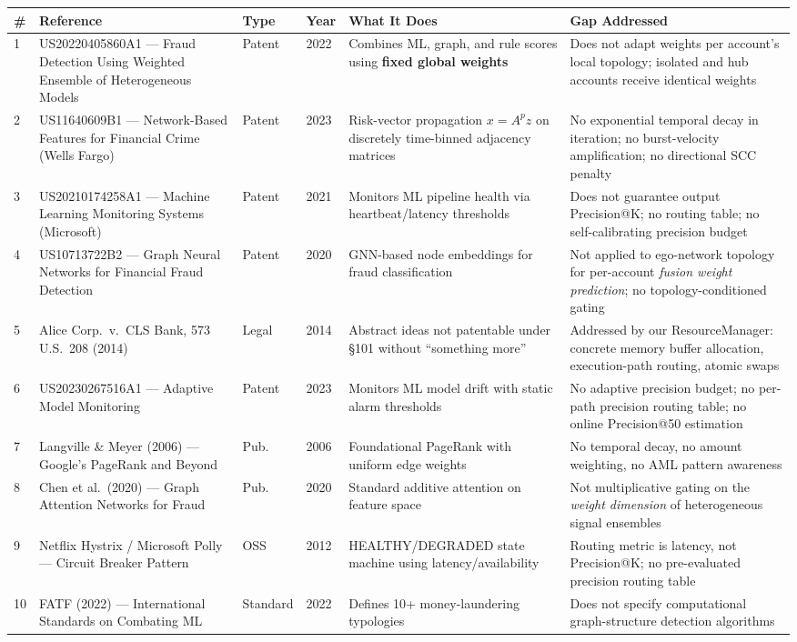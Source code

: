 \documentclass[12pt,a4paper]{article}
\begin{document}
\begin{longtable}{p{0.3cm} p{4.0cm} p{1.0cm} p{0.6cm} p{4.5cm} p{3.5cm}}
\toprule
\# & Reference & Type & Year & What It Does & Gap Addressed \\
\midrule
\endhead
1 & US20220405860A1 --- Fraud Detection Using Weighted Ensemble of Heterogeneous Models & Patent & 2022 &
  Combines ML, graph, and rule scores using \textbf{fixed global weights} &
  Does not adapt weights per account's local topology; isolated and hub accounts receive identical weights \\
\midrule
2 & US11640609B1 --- Network-Based Features for Financial Crime (Wells Fargo) & Patent & 2023 &
  Risk-vector propagation $x = A^p z$ on discretely time-binned adjacency matrices &
  No exponential temporal decay in iteration; no burst-velocity amplification; no directional SCC penalty \\
\midrule
3 & US20210174258A1 --- Machine Learning Monitoring Systems (Microsoft) & Patent & 2021 &
  Monitors ML pipeline health via heartbeat/latency thresholds &
  Does not guarantee output Precision@K; no routing table; no self-calibrating precision budget \\
\midrule
4 & US10713722B2 --- Graph Neural Networks for Financial Fraud Detection & Patent & 2020 &
  GNN-based node embeddings for fraud classification &
  Not applied to ego-network topology for per-account \emph{fusion weight prediction}; no topology-conditioned gating \\
\midrule
5 & Alice Corp.\ v.\ CLS Bank, 573 U.S.\ 208 (2014) & Legal & 2014 &
  Abstract ideas not patentable under \S101 without ``something more'' &
  Addressed by our ResourceManager: concrete memory buffer allocation, execution-path routing, atomic swaps \\
\midrule
6 & US20230267516A1 --- Adaptive Model Monitoring & Patent & 2023 &
  Monitors ML model drift with static alarm thresholds &
  No adaptive precision budget; no per-path precision routing table; no online Precision@50 estimation \\
\midrule
7 & Langville \& Meyer (2006) --- Google's PageRank and Beyond & Pub. & 2006 &
  Foundational PageRank with uniform edge weights &
  No temporal decay, no amount weighting, no AML pattern awareness \\
\midrule
8 & Chen et al.\ (2020) --- Graph Attention Networks for Fraud & Pub. & 2020 &
  Standard additive attention on feature space &
  Not multiplicative gating on the \emph{weight dimension} of heterogeneous signal ensembles \\
\midrule
9 & Netflix Hystrix / Microsoft Polly --- Circuit Breaker Pattern & OSS & 2012 &
  HEALTHY/DEGRADED state machine using latency/availability &
  Routing metric is latency, not Precision@K; no pre-evaluated precision routing table \\
\midrule
10 & FATF (2022) --- International Standards on Combating ML & Standard & 2022 &
  Defines 10+ money-laundering typologies &
  Does not specify computational graph-structure detection algorithms \\
\bottomrule
\end{longtable}
\end{document}
